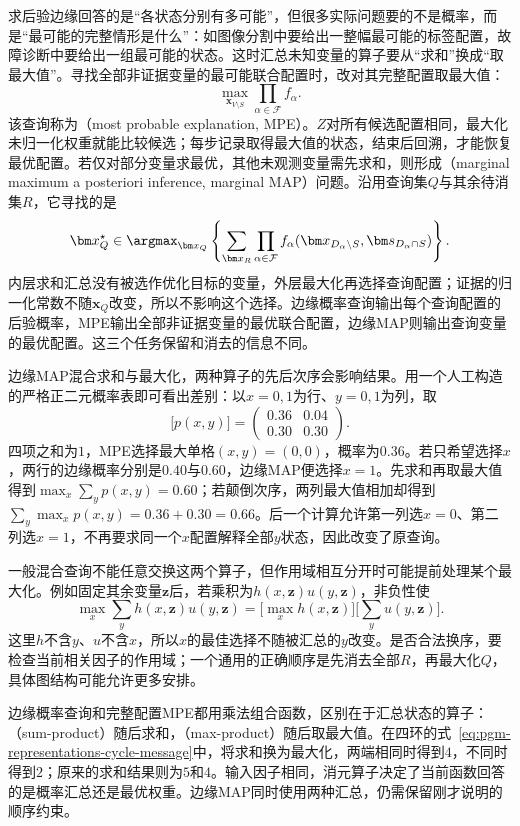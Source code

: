 求后验边缘回答的是“各状态分别有多可能”，但很多实际问题要的不是概率，而是“最可能的完整情形是什么”：如图像分割中要给出一整幅最可能的标签配置，故障诊断中要给出一组最可能的状态。这时汇总未知变量的算子要从“求和”换成“取最大值”。寻找全部非证据变量的最可能联合配置时，改对其完整配置取最大值：
\[
  \max_{\bm{x}_{V\setminus S}}
  \prod_{\alpha\in\mathcal{F}}f_\alpha.
\]
该查询称为（most probable explanation, MPE）。$Z$对所有候选配置相同，最大化未归一化权重就能比较候选；每步记录取得最大值的状态，结束后回溯，才能恢复最优配置。若仅对部分变量求最优，其他未观测变量需先求和，则形成（marginal maximum a posteriori inference, marginal MAP）问题。沿用查询集$Q$与其余待消集$R$，它寻找的是
\begin{equation}
  \bm x_Q^\star\in
  \argmax_{\bm x_Q}\left\{
    \sum_{\bm x_R}
    \prod_{\alpha\in\mathcal F}
      f_\alpha(\bm x_{D_\alpha\setminus S},
        \bm s_{D_\alpha\cap S})
  \right\}.
  \label{eq:pgm-representations-marginal-map}
\end{equation}
内层求和汇总没有被选作优化目标的变量，外层最大化再选择查询配置；证据的归一化常数不随$\bm x_Q$改变，所以不影响这个选择。边缘概率查询输出每个查询配置的后验概率，MPE输出全部非证据变量的最优联合配置，边缘MAP则输出查询变量的最优配置。这三个任务保留和消去的信息不同。

边缘MAP混合求和与最大化，两种算子的先后次序会影响结果。用一个人工构造的严格正二元概率表即可看出差别：以$x=0,1$为行、$y=0,1$为列，取
\[
  \bigl[p(x,y)\bigr]=
  \begin{pmatrix}
    0.36&0.04\\
    0.30&0.30
  \end{pmatrix}.
\]
四项之和为$1$，MPE选择最大单格$(x,y)=(0,0)$，概率为$0.36$。若只希望选择$x$，两行的边缘概率分别是$0.40$与$0.60$，边缘MAP便选择$x=1$。先求和再取最大值得到$\max_x\sum_y p(x,y)=0.60$；若颠倒次序，两列最大值相加却得到$\sum_y\max_x p(x,y)=0.36+0.30=0.66$。后一个计算允许第一列选$x=0$、第二列选$x=1$，不再要求同一个$x$配置解释全部$y$状态，因此改变了原查询。

一般混合查询不能任意交换这两个算子，但作用域相互分开时可能提前处理某个最大化。例如固定其余变量$\bm z$后，若乘积为$h(x,\bm z)u(y,\bm z)$，非负性使
\[
  \max_x\sum_y h(x,\bm z)u(y,\bm z)
    =\bigl[\max_x h(x,\bm z)\bigr]
      \bigl[\sum_y u(y,\bm z)\bigr].
\]
这里$h$不含$y$、$u$不含$x$，所以$x$的最佳选择不随被汇总的$y$改变。是否合法换序，要检查当前相关因子的作用域；一个通用的正确顺序是先消去全部$R$，再最大化$Q$，具体图结构可能允许更多安排。

边缘概率查询和完整配置MPE都用乘法组合函数，区别在于汇总状态的算子：（sum-product）随后求和，（max-product）随后取最大值。在四环的式~\eqref{eq:pgm-representations-cycle-message}中，将求和换为最大化，两端相同时得到$4$，不同时得到$2$；原来的求和结果则为$5$和$4$。输入因子相同，消元算子决定了当前函数回答的是概率汇总还是最优权重。边缘MAP同时使用两种汇总，仍需保留刚才说明的顺序约束。

